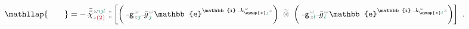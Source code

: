 \begin{subequations}
\begin{align}
	&\mathllap{ \hphantom{\xint{\mathcolor{gray}{-}}{25}{\bar{\bar{V}}}^{\;\! \mathcolor{gray}{\omega} \textcolor{PineGreen}{\imath}} } } = - \xint{{}^{}_{\mathcolor{gray}{-}}}{23}{\bar{\bar{\bar{\chi}}}}^{\;\! \mathcolor{gray}{\omega} \textcolor{PineGreen}{\imath \jmath l}}_{\mathcolor{gray}{z} \textcolor{Maroon}{(2)}} ~{}^{\mathcolor{gray}{*}}_{\mathcolor{gray}{*}} \left[ \left( \xint{\begin{smallmatrix} ~ \\ {}^{}_{\mathcolor{gray}{-}} \\ ~ \end{smallmatrix}}{09}{\mathtt{g}}^{\;\!\mathcolor{gray}{\omega}}_{\;\! \mathcolor{gray}{z} \textcolor{PineGreen}{\jmath}} \xint{{}^{}_{\mathcolor{gray}{-}}}{10}{\bar{g}}^{\;\!\mathcolor{gray}{\omega}}_{\;\! \textcolor{PineGreen}{\jmath}} \mathbb{e}^{\mathbb{i} \xint{\begin{smallmatrix} ~ \\ {}^{}_{\mathcolor{gray}{-}} \\ ~ \end{smallmatrix}}{15}{k}_{\symup{z} \textcolor{PineGreen}{\jmath}}^{\;\! \mathcolor{gray}{\omega}} \mathcolor{gray}{z}} \right) ~\mathcolor{gray}{\widetilde \circledast}~ \left( \xint{\begin{smallmatrix} ~ \\ {}^{}_{\mathcolor{gray}{-}} \\ ~ \end{smallmatrix}}{09}{\mathtt{g}}^{\;\!\mathcolor{gray}{\omega}}_{\;\! \mathcolor{gray}{z} \textcolor{PineGreen}{l}} \xint{{}^{}_{\mathcolor{gray}{-}}}{10}{\bar{g}}^{\;\!\mathcolor{gray}{\omega}}_{\;\! \textcolor{PineGreen}{l}} \mathbb{e}^{\mathbb{i} \xint{\begin{smallmatrix} ~ \\ {}^{}_{\mathcolor{gray}{-}} \\ ~ \end{smallmatrix}}{15}{k}_{\symup{z} \textcolor{PineGreen}{l}}^{\;\! \mathcolor{gray}{\omega}} \mathcolor{gray}{z}} \right) \right] \label{eq:nonlinear(2)-wave_wkrho-simplify6-V3''} ~.
\end{align}
\end{subequations}

